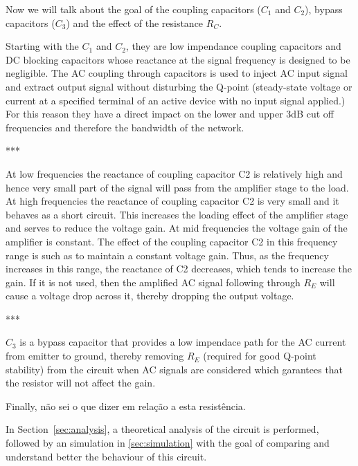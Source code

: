 Now we will talk about the goal of the coupling capacitors ($C_{1}$ and $C_{2}$), bypass capacitors ($C_{3}$) and the effect of the resistance $R_{C}$.


Starting with the $C_{1}$ and $C_{2}$, they are low impendance coupling capacitors and DC blocking capacitors whose reactance at the signal frequency is designed to be negligible.
The AC coupling through capacitors is used to inject AC input signal and extract output signal without disturbing the Q-point (steady-state voltage or current at a specified terminal of an active device with no input signal applied.)
For this reason they have a direct impact on the lower and upper 3dB cut off frequencies and therefore the bandwidth of the network.

***

At low frequencies the reactance of coupling capacitor C2 is relatively high and hence very small part of the signal will pass from the amplifier stage to the load.
At high frequencies the reactance of coupling capacitor C2 is very small and it behaves as a short circuit. This increases the loading effect of the amplifier stage and serves to reduce the voltage gain.
At mid frequencies the voltage gain of the amplifier is constant. The effect of the coupling capacitor C2 in this frequency range is such as to maintain a constant voltage gain. Thus, as the frequency increases in this range, the reactance of C2 decreases, which tends to increase the gain.
If it is not used, then the amplified AC signal following through $R_{E}$ will cause a voltage drop across it, thereby dropping the output voltage.

***

$C_{3}$ is a bypass capacitor that provides a low impendace path for the AC current from emitter to ground,
thereby removing $R_{E}$ (required for good Q-point stability) from the circuit when AC signals are considered which garantees that the resistor will not affect the gain.

Finally, não sei o que dizer em relação a esta resistência.


In Section~\ref{sec:analysis}, a theoretical analysis of the circuit is performed, followed by an simulation in \ref{sec:simulation}
with the goal of comparing and understand better the behaviour of this circuit.


